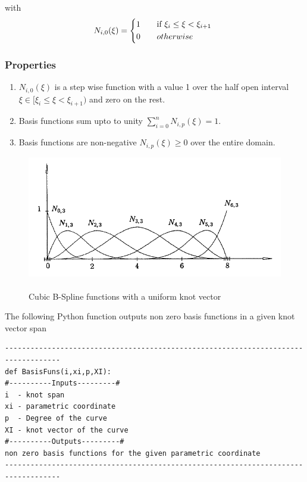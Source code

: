 \documentclass[11pt]{article}
\begin{document}
\noindent
with
\begin{equation}
N_{i,0}(\xi) = 
\begin{cases*}
1 \quad& if $  \xi_{i} \leq \xi<\xi_{i+1} $ \\
0 &  $ otherwise $ \\
\end{cases*}
\end{equation}

\subsubsection{Properties }
\begin{enumerate}
	\item $ N_{i,0}(\xi)$ is a step wise function with a value 1 over the half open interval $ \xi \in [\xi_{i}  \leq \xi<\xi_{i+1}) $ and zero on the rest. 
	\item Basis functions sum upto to unity $\sum_{i=0}^{n} N_{i,p}(\xi) =1$.
	\item Basis functions are non-negative $ N_{i,p}(\xi) \geq 0$ over the entire domain.
\end{enumerate}

\begin{figure}[H]
	\begin{center}
		\includegraphics[scale=0.7]{BSplineBasisFunctions.png}
		\caption{\\Cubic B-Spline functions with a uniform knot vector \cite{piegl2012nurbs}   }\label{BSplineBasisFunctions}
	\end{center}	
\end{figure}
\noindent
The following Python function outputs non zero basis functions in a given knot vector span
\begin{verbatim}
-----------------------------------------------------------------------------------
def BasisFuns(i,xi,p,XI):
#----------Inputs---------#
i  - knot span
xi - parametric coordinate
p  - Degree of the curve
XI - knot vector of the curve
#----------Outputs---------#
non zero basis functions for the given parametric coordinate
-----------------------------------------------------------------------------------
\end{verbatim}
\end{document}
